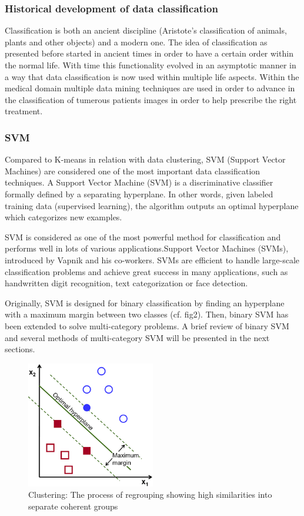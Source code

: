 \documentclass[]{article}
\begin{document}
\subsubsection{Historical development of data classification}
Classification is both an ancient discipline (Aristote's classification of animals, plants and other objects) and a modern one\cite{arabie1996clustering}.
The idea of classification as presented before started in ancient times in order to have a certain order within the normal life. With time this functionality evolved in an asymptotic manner in a way that data classification is now used within multiple life aspects. Within the medical domain multiple data mining techniques are used in order to advance in the classification of tumerous patients images in order to help prescribe the right treatment.

\subsubsection{SVM}
\noindent Compared to K-means in relation with data clustering, SVM (Support Vector Machines) are considered one of the most important data classification techniques. A Support Vector Machine (SVM) is a discriminative classifier formally defined by a separating hyperplane. In other words, given labeled training data (supervised learning), the algorithm outputs an optimal hyperplane which categorizes new examples.

SVM is considered as one of the most powerful method for classification and performs well in lots of various applications\cite{cortes1995support}.Support Vector Machines (SVMs), introduced by Vapnik and his co-workers\cite{vapnik2013nature}\cite{boser1992training}. SVMs are efficient to handle large-scale classification problems  and  achieve  great  success  in  many  applications,  such  as  handwritten digit recognition, text categorization or face detection\cite{andrew2000introduction}.

Originally, SVM is designed for binary classification by finding an hyperplane
with a maximum margin between two classes (cf. fig2).  Then, binary SVM has been extended to solve multi-category problems. A brief review of binary SVM and several methods of multi-category SVM will be presented in the next sections.

\begin{figure}[h!]
	\centering
	\includegraphics[width=0.5\textwidth]{optimal-hyperplane.png}
	\caption{Clustering: The process of regrouping showing high similarities into separate coherent groups}
\end{figure} 
\end{document}
